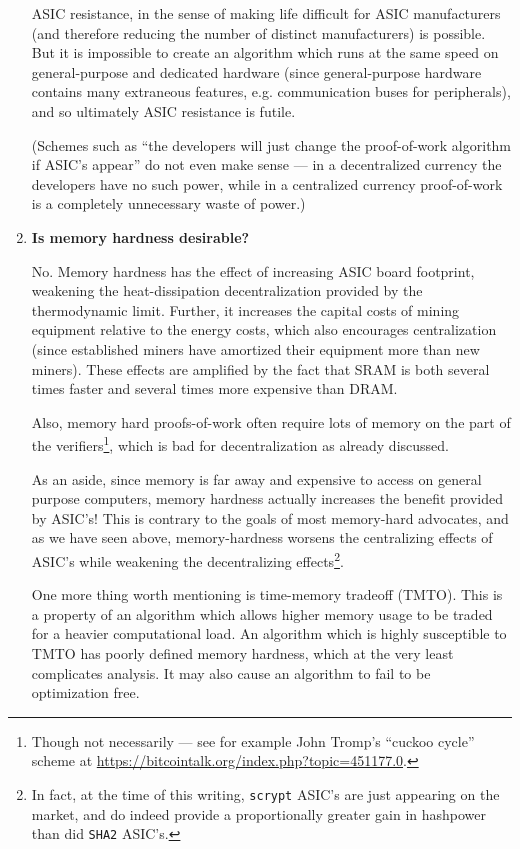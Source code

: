 \documentclass[letterpaper]{article}
\theoremstyle{xxx}
\theoremstyle{evil}
\theoremstyle{yyy}
\theoremstyle{plain}
\theoremstyle{zzz}
\begin{document}
\begin{enumerate}
ASIC resistance, in the sense of making life difficult for ASIC
manufacturers (and therefore reducing the number of distinct
manufacturers) is possible. But it is impossible to create
an algorithm which runs at the same speed on general-purpose and
dedicated hardware (since general-purpose hardware contains many
extraneous features, e.g. communication buses for peripherals),
and  so ultimately ASIC resistance is futile.

(Schemes such as ``the developers will just change the proof-of-work
algorithm if ASIC's appear'' do not even make sense --- in a decentralized
currency the developers have no such power, while in a centralized
currency proof-of-work is a completely unnecessary waste of power.)

\item \textbf{Is memory hardness desirable?}

No. Memory hardness has the effect of increasing ASIC board footprint,
weakening the heat-dissipation decentralization provided by the
thermodynamic limit. Further, it increases the capital costs of
mining equipment relative to the energy costs, which also encourages
centralization (since established miners have amortized their equipment
more than new miners). These effects are amplified by the fact that
SRAM is both several times faster and several times more expensive
than DRAM.

Also, memory hard proofs-of-work often require lots of memory on the
part of the verifiers\footnote{Though not necessarily --- see for example
John Tromp's ``cuckoo cycle'' scheme at \url{https://bitcointalk.org/index.php?topic=451177.0}.},
which is bad for decentralization as already discussed.

As an aside, since memory is far away and expensive to access on general
purpose computers, memory hardness actually increases the benefit provided
by ASIC's! This is contrary to the goals of most memory-hard advocates,
and as we have seen above, memory-hardness worsens the centralizing effects
of ASIC's while weakening the decentralizing effects\footnote{In fact, at
the time of this writing, \texttt{scrypt} ASIC's are just appearing on the
market, and do indeed provide a proportionally greater gain in hashpower
than did \texttt{SHA2} ASIC's.}.

One more thing worth mentioning is time-memory tradeoff (TMTO). This is
a property of an algorithm which allows higher memory usage to be traded
for a heavier computational load. An algorithm which is highly susceptible
to TMTO has poorly defined memory hardness, which at the very least
complicates analysis. It may also cause an algorithm to fail to be optimization
free.


\end{enumerate}
\end{document}
